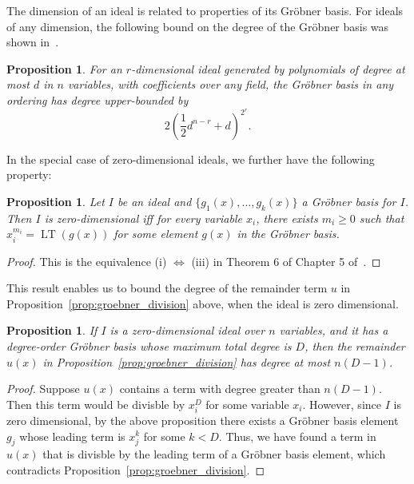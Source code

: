 \documentclass[aps,pra,notitlepage,preprintnumbers,11pt,tightenlines]{revtex4-1}
\DeclareMathOperator{\LT}{LT}
\newtheorem{proposition}[theorem]{Proposition}
\begin{document}
The dimension of an ideal is related to properties of its Gr\"{o}bner
basis. For ideals of any dimension, the following bound on the degree
of the Gr\"{o}bner basis was shown in~\cite{mayr:2010}.
\begin{proposition}
  For an $r$-dimensional
  ideal generated by polynomials of degree at most $d$ in $n$
  variables, with coefficients over any field, the Gr\"{o}bner basis in any ordering has degree
  upper-bounded by
  \[ 2\left(\frac{1}{2} d^{n-r} + d\right)^{2^r} . \]
  \label{prop:groebner_degree}
\end{proposition}
In the special case of zero-dimensional ideals, we further have the
following property:
\begin{proposition}
  Let $I$ be an ideal and $\{g_1(x), \dots, g_k(x)\}$ a Gr\"{o}bner basis
  for $I$. Then $I$ is zero-dimensional iff for every variable $x_i$, there
  exists $m_i \geq 0$ such that $x_i^{m_i} = \LT(g(x))$ for some
  element $g(x)$ in the Gr\"{o}bner basis. 
\end{proposition}
\begin{proof}
  This is the equivalence (i) $\iff$ (iii) in Theorem 6 of Chapter 5
  of~\cite{clo:1996}.
\end{proof}
This result enables us to bound the degree of the remainder term $u$
in Proposition~\ref{prop:groebner_division} above, when the ideal is
zero dimensional.
\begin{proposition}
  If $I$ is a zero-dimensional ideal over $n$ variables, and it has a
  degree-order Gr\"{o}bner basis whose
  maximum total degree is $D$, then the remainder $u(x)$ in
  Proposition~\ref{prop:groebner_division} has degree at most
  $n(D-1)$.
  \label{prop:groebner_zerod_division}
\end{proposition}
\begin{proof}
  Suppose $u(x)$ contains a term with degree greater than
  $n(D-1)$. Then this term would be divisble by $x_i^D$ for some
  variable $x_i$. However, since $I$ is zero dimensional, by the above
  proposition there exists a Gr\"{o}bner basis element $g_j$ whose
  leading term is $x_j^k$ for some $k < D$. Thus, we have found a term
  in $u(x)$ that is divisble by the leading term of a Gr\"{o}bner
  basis element, which contradicts
  Proposition~\ref{prop:groebner_division}.
\end{proof}
\end{document}
